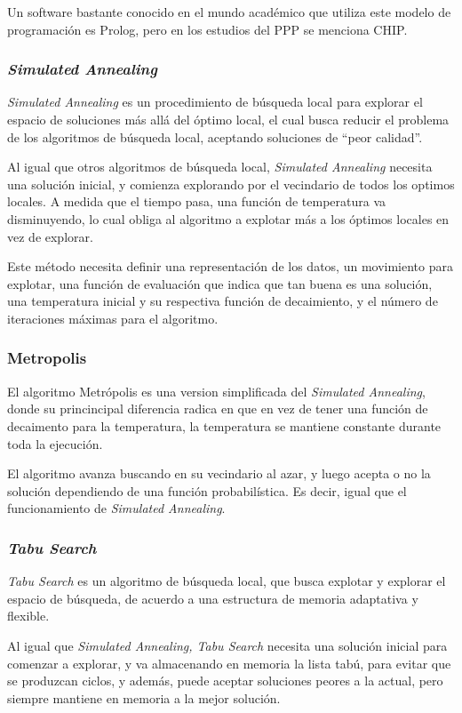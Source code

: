 \documentclass[letter, 10pt]{article}
\begin{document}
Un software bastante conocido en el mundo académico que utiliza este modelo de programación es Prolog, pero en los estudios del PPP se menciona CHIP.

\subsubsection{\textit{Simulated Annealing}}
\textit{Simulated Annealing} es un procedimiento de búsqueda local para explorar el espacio de soluciones más allá del óptimo local, el cual busca reducir el problema de los algoritmos de búsqueda local, aceptando soluciones de ``peor calidad''.

Al igual que otros algoritmos de búsqueda local, \textit{Simulated Annealing} necesita una solución inicial, y comienza explorando por el vecindario de todos los optimos locales. A medida que el tiempo pasa, una función de temperatura va disminuyendo, lo cual obliga al algoritmo a explotar más a los óptimos locales en vez de explorar.

Este método necesita definir una representación de los datos, un movimiento para explotar, una función de evaluación que indica que tan buena es una solución, una temperatura inicial y su respectiva función de decaimiento, y el número de iteraciones máximas para el algoritmo.

\subsubsection{Metropolis}
El algoritmo Metrópolis es una version simplificada del \textit{Simulated Annealing}, donde su princincipal diferencia radica en que en vez de tener una función de decaimento para la temperatura, la temperatura se mantiene constante durante toda la ejecución.

El algoritmo avanza buscando en su vecindario al azar, y luego acepta o no la solución dependiendo de una función probabilística. Es decir, igual que el funcionamiento de \textit{Simulated Annealing}.

\subsubsection{\textit{Tabu Search}}
\textit{Tabu Search} es un algoritmo de búsqueda local, que busca explotar y explorar el espacio de búsqueda, de acuerdo a una estructura de memoria adaptativa y flexible.

Al igual que \textit{Simulated Annealing, Tabu Search} necesita una solución inicial para comenzar a explorar, y va almacenando en memoria la lista tabú, para evitar que se produzcan ciclos, y además, puede aceptar soluciones peores a la actual, pero siempre mantiene en memoria a la mejor solución.
\end{document}
